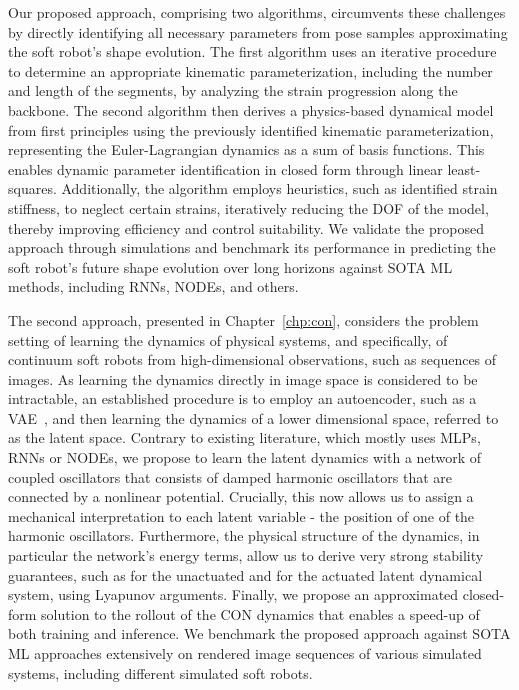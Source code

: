Our proposed approach, comprising two algorithms, circumvents these challenges by directly identifying all necessary parameters from pose samples approximating the soft robot’s shape evolution.
The first algorithm uses an iterative procedure to determine an appropriate kinematic parameterization, including the number and length of the segments, by analyzing the strain progression along the backbone.
The second algorithm then derives a physics-based dynamical model from first principles using the previously identified kinematic parameterization, representing the Euler-Lagrangian dynamics as a sum of basis functions. This enables dynamic parameter identification in closed form through linear least-squares.
Additionally, the algorithm employs heuristics, such as identified strain stiffness, to neglect certain strains, iteratively reducing the \gls{DOF} of the model, thereby improving efficiency and control suitability.
We validate the proposed approach through simulations and benchmark its performance in predicting the soft robot’s future shape evolution over long horizons against \gls{SOTA} \gls{ML} methods, including \glspl{RNN}, \glspl{NODE}, and others.

The second approach, presented in Chapter~\ref{chp:con}, considers the problem setting of learning the dynamics of physical systems, and specifically, of continuum soft robots from high-dimensional observations, such as sequences of images.
As learning the dynamics directly in image space is considered to be intractable, an established procedure is to employ an autoencoder, such as a \gls{VAE}~\cite{kingma2014auto}, and then learning the dynamics of a lower dimensional space, referred to as the latent space.
Contrary to existing literature, which mostly uses \glspl{MLP}, \glspl{RNN} or \glspl{NODE}, we propose to learn the latent dynamics with a network of coupled oscillators that consists of damped harmonic oscillators that are connected by a nonlinear potential.
Crucially, this now allows us to assign a mechanical interpretation to each latent variable - the position of one of the harmonic oscillators.
Furthermore, the physical structure of the  dynamics, in particular the network's energy terms, allow us to derive very strong stability guarantees, such as  for the unactuated and  for the actuated latent dynamical system, using Lyapunov arguments\cite{khalil2002nonlinear}.
Finally, we propose an approximated closed-form solution to the rollout of the \gls{CON} dynamics that enables a speed-up of both training and inference.
We benchmark the proposed approach against \gls{SOTA} \gls{ML} approaches extensively on rendered image sequences of various simulated systems, including different simulated soft robots.


